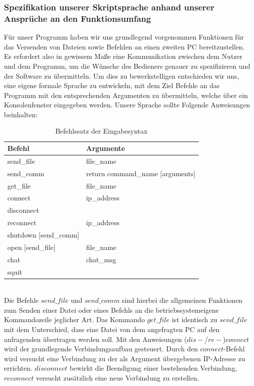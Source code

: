 \subsubsection{Spezifikation unserer Skriptsprache anhand unserer Ansprüche an den Funktionsumfang}
Für unser Programm haben wir uns grundlegend vorgenommen Funktionen für das Versenden von Dateien sowie Befehlen an einen zweiten PC bereitzustellen. 
Es erfordert also in gewissem Maße eine Kommunikation zwischen dem Nutzer und dem Programm, um die Wünsche des Bedieners genauer zu spezifizieren und der Software zu übermitteln. 
Um dies zu bewerkstelligen entschieden wir uns, eine eigene formale Sprache zu entwickeln, mit dem Ziel Befehle an das Programm mit den entsprechenden Argumenten zu übermitteln, welche über ein Konsolenfenster eingegeben werden.
Unsere Sprache sollte Folgende Anweisungen beinhalten:\\
\begin{table}[h!]
\centering
\begin{tabular}{|ll|}
\hline
Befehl & Argumente \\ \hline
send\_file & file\_name \\
send\_comm & return command\_name {[}arguments{]} \\
get\_file & file\_name \\
connect & ip\_address \\
disconnect & \\
reconnect & ip\_address \\
shutdown [send\_comm] & \\
open [send\_file] & file\_name \\
chat & chat\_msg \\
squit & \\ \hline
\end{tabular}
\caption{Befehlssatz der Eingabesyntax}
\label{befehl}
\end{table}\\
Die Befehle $send\_file$ und $send\_comm$ sind hierbei die allgemeinen Funktionen zum Senden einer Datei oder eines Befehls an die betriebssystemeigene Kommandozeile jeglicher Art. Das Kommando $get\_file$ ist identisch zu $send\_file$ mit dem Unterschied, dass eine Datei von dem angefragten PC auf den anfragenden übertragen werden soll. Mit den Anweisungen ($dis-$/$re-$)$connect$ wird der grundlegende Verbindungsaufbau gesteuert. Durch den $connect$-Befehl wird versucht eine Verbindung zu der als Argument übergebenen IP-Adresse zu errichten. $disconnect$ bewirkt die Beendigung einer bestehenden Verbindung, $reconnect$ versucht zusätzlich eine neue Verbindung zu erstellen. 
